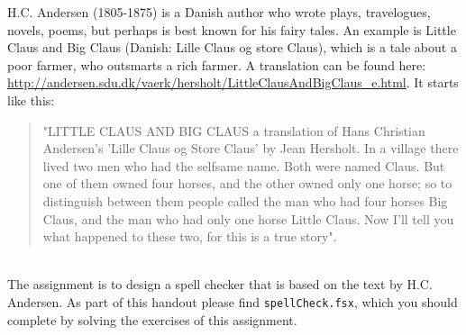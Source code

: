 H.C. Andersen (1805-1875) is a Danish author who wrote plays, travelogues, novels, poems, but perhaps is best known for his fairy tales. An example is Little Claus and Big Claus (Danish: Lille Claus og store Claus), which is a tale about a poor farmer, who outsmarts a rich farmer. A translation can be found here: \url{http://andersen.sdu.dk/vaerk/hersholt/LittleClausAndBigClaus_e.html}. It starts like this: 
\begin{quote}
"LITTLE CLAUS AND BIG CLAUS a translation of Hans Christian Andersen’s 'Lille Claus og Store Claus’ by Jean Hersholt.
In a village there lived two men who had the selfsame name. Both were named Claus. But one of them owned four horses, and the other owned only one horse; so to distinguish between them people called the man who had four horses Big Claus, and the man who had only one horse Little Claus. Now I’ll tell you what happened to these two, for this is a true story".
\end{quote}
~~\\
The assignment is to design a spell checker that is based on the text by H.C. Andersen. As part of this handout please find \texttt{spellCheck.fsx}, which you should complete by solving the exercises of this assignment. 
